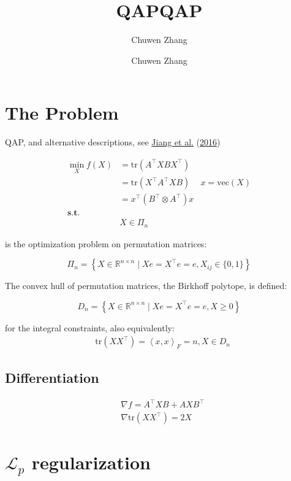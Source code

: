 \documentclass[
  10pt,
  a4paper,
,tablecaptionabove
]{scrartcl}
\title{QAP}
\author{Chuwen Zhang}
\date{}
\title{QAP}
\author{Chuwen Zhang}
\begin{document}




\hypertarget{the-problem}{%
\section{The Problem}\label{the-problem}}

QAP, and alternative descriptions, see
\protect\hyperlink{ref-jiang_l_p-norm_2016}{Jiang et al.}
(\protect\hyperlink{ref-jiang_l_p-norm_2016}{2016})

\[\begin{aligned}
\min_X f(X) &= \textrm{tr}(A^\top XB X^\top)  \\
& = \textrm{tr}(X^\top A^\top XB) & x = \textrm{vec}(X)\\
& = x^\top (B^\top \otimes A^\top) x\\ 
\mathbf{s.t.} & \\ 
&X \in \Pi_{n}
\end{aligned}\]

is the optimization problem on permutation matrices:

\[ \Pi_{n}=\left\{X \in \mathbb R ^{n \times n} \mid X e =X^{\top} e = e , X_{i j} \in\{0,1\}\right\}\]

The convex hull of permutation matrices, the Birkhoﬀ polytope, is
defined:

\[D _{n}=\left\{X \in \mathbb R ^{n \times n} \mid X e =X^{\top} e = e , X \geq 0 \right\}\]

for the integral constraints, also equivalently: \[\begin{aligned}
& \textrm{tr}(XX^\top) = \left <x, x \right >_F= n, X \in D_{n}
\end{aligned}\]

\hypertarget{differentiation}{%
\subsection{Differentiation}\label{differentiation}}

\[\begin{aligned}
&  \nabla f = A^\top XB + AXB^\top \\
& \nabla \textrm{tr}(XX^\top) = 2X
\end{aligned}\]

\hypertarget{mathscr-l_p-regularization}{%
\section{\texorpdfstring{\(\mathscr L_p\)
regularization}{\textbackslash mathscr L\_p regularization}}\label{mathscr-l_p-regularization}}
\end{document}
